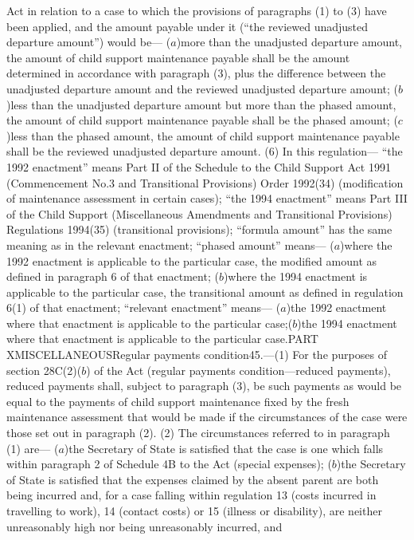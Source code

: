 \documentclass[a4paper]{article}
\begin{document}
Act in relation to a case to which the provisions of paragraphs (1) to (3) have
been applied, and the amount payable under it (“the reviewed unadjusted
departure amount”) would be—
($a$)more than the unadjusted departure amount, the amount of child support
maintenance payable shall be the amount determined in accordance with paragraph
(3), plus the difference between the unadjusted departure amount and the
reviewed unadjusted departure amount;
($b$)less than the unadjusted departure amount but more than the phased amount,
the amount of child support maintenance payable shall be the phased amount;
($c$)less than the phased amount, the amount of child support maintenance payable
shall be the reviewed unadjusted departure amount.
(6) In this regulation—
“the 1992 enactment” means Part II of the Schedule to the Child Support Act 1991
(Commencement No.3 and Transitional Provisions) Order 1992(34) (modification of
maintenance assessment in certain cases);
“the 1994 enactment” means Part III of the Child Support (Miscellaneous
Amendments and Transitional Provisions) Regulations 1994(35) (transitional
provisions);
“formula amount” has the same meaning as in the relevant enactment;
“phased amount” means—
($a$)where the 1992 enactment is applicable to the particular case, the modified
amount as defined in paragraph 6 of that enactment;
($b$)where the 1994 enactment is applicable to the particular case, the
transitional amount as defined in regulation 6(1) of that enactment;
“relevant enactment” means—
($a$)the 1992 enactment where that enactment is applicable to the particular case;($b$)the 1994 enactment where that enactment is applicable to the particular case.PART XMISCELLANEOUSRegular payments condition45.—(1) For the purposes of section
28C(2)($b$) of the Act (regular payments condition—reduced payments), reduced
payments shall, subject to paragraph (3), be such payments as would be equal to
the payments of child support maintenance fixed by the fresh maintenance
assessment that would be made if the circumstances of the case were those set
out in paragraph (2).
(2) The circumstances referred to in paragraph (1) are—
($a$)the Secretary of State is satisfied that the case is one which falls within
paragraph 2 of Schedule 4B to the Act (special expenses);
($b$)the Secretary of State is satisfied that the expenses claimed by the absent
parent are both being incurred and, for a case falling within regulation 13
(costs incurred in travelling to work), 14 (contact costs) or 15 (illness or
disability), are neither unreasonably high nor being unreasonably incurred, and
\end{document}
